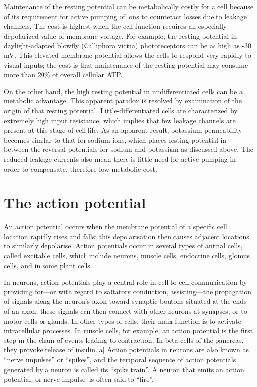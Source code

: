 Maintenance of the resting potential can be metabolically costly for a cell because of its requirement for active pumping of ions to counteract losses due to leakage channels. The cost is highest when the cell function requires an especially depolarized value of membrane voltage. For example, the resting potential in daylight-adapted blowfly (Calliphora vicina) photoreceptors can be as high as -30 mV. This elevated membrane potential allows the cells to respond very rapidly to visual inputs; the cost is that maintenance of the resting potential may consume more than 20\% of overall cellular ATP.

On the other hand, the high resting potential in undifferentiated cells can be a metabolic advantage. This apparent paradox is resolved by examination of the origin of that resting potential. Little-differentiated cells are characterized by extremely high input resistance, which implies that few leakage channels are present at this stage of cell life. As an apparent result, potassium permeability becomes similar to that for sodium ions, which places resting potential in-between the reversal potentials for sodium and potassium as discussed above. The reduced leakage currents also mean there is little need for active pumping in order to compensate, therefore low metabolic cost.

\hypertarget{the-action-potential}{%
\section{The action potential}\label{the-action-potential}}

An action potential occurs when the membrane potential of a specific cell location rapidly rises and falls: this depolarisation then causes adjacent locations to similarly depolarise. Action potentials occur in several types of animal cells, called excitable cells, which include neurons, muscle cells, endocrine cells, glomus cells, and in some plant cells.

In neurons, action potentials play a central role in cell-to-cell communication by providing for---or with regard to saltatory conduction, assisting---the propagation of signals along the neuron's axon toward synaptic boutons situated at the ends of an axon; these signals can then connect with other neurons at synapses, or to motor cells or glands. In other types of cells, their main function is to activate intracellular processes. In muscle cells, for example, an action potential is the first step in the chain of events leading to contraction. In beta cells of the pancreas, they provoke release of insulin.{[}a{]} Action potentials in neurons are also known as ``nerve impulses'' or ``spikes'', and the temporal sequence of action potentials generated by a neuron is called its ``spike train''. A neuron that emits an action potential, or nerve impulse, is often said to ``fire''.

